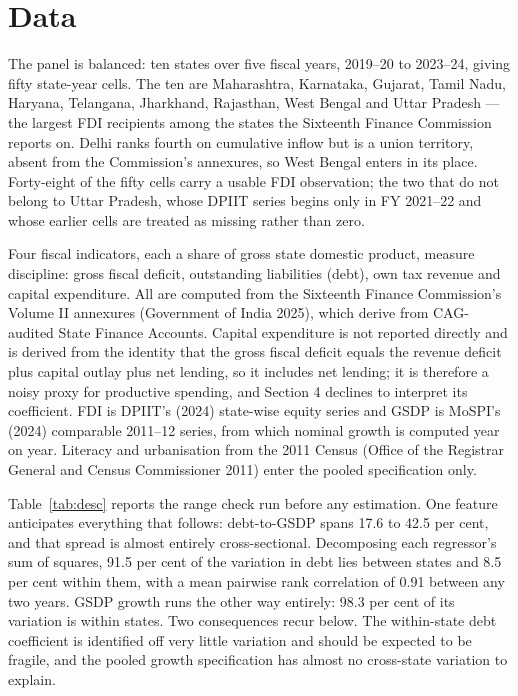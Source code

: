 \documentclass[12pt]{article}
\begin{document}
\section{Data}

The panel is balanced: ten states over five fiscal years, 2019--20 to 2023--24,
giving fifty state-year cells. The ten are Maharashtra, Karnataka, Gujarat, Tamil
Nadu, Haryana, Telangana, Jharkhand, Rajasthan, West Bengal and Uttar Pradesh ---
the largest FDI recipients among the states the Sixteenth Finance Commission
reports on. Delhi ranks fourth on cumulative inflow but is a union territory,
absent from the Commission's annexures, so West Bengal enters in its place.
Forty-eight of the fifty cells carry a usable FDI observation; the two that do
not belong to Uttar Pradesh, whose DPIIT series begins only in FY 2021--22 and
whose earlier cells are treated as missing rather than zero.

Four fiscal indicators, each a share of gross state domestic product, measure
discipline: gross fiscal deficit, outstanding liabilities (debt), own tax revenue
and capital expenditure. All are computed from the Sixteenth Finance Commission's
Volume II annexures (Government of India 2025), which derive from CAG-audited
State Finance Accounts. Capital expenditure is not reported directly and is
derived from the identity that the gross fiscal deficit equals the revenue
deficit plus capital outlay plus net lending, so it includes net lending; it is
therefore a noisy proxy for productive spending, and Section 4 declines to
interpret its coefficient. FDI is DPIIT's (2024) state-wise equity series and
GSDP is MoSPI's (2024) comparable 2011--12 series, from which nominal growth is
computed year on year. Literacy and urbanisation from the 2011 Census (Office of
the Registrar General and Census Commissioner 2011) enter the pooled
specification only.

Table~\ref{tab:desc} reports the range check run before any estimation. One
feature anticipates everything that follows: debt-to-GSDP spans 17.6 to 42.5 per
cent, and that spread is almost entirely cross-sectional. Decomposing each
regressor's sum of squares, 91.5 per cent of the variation in debt lies between
states and 8.5 per cent within them, with a mean pairwise rank correlation of
0.91 between any two years. GSDP growth runs the other way entirely: 98.3 per
cent of its variation is within states. Two consequences recur below. The
within-state debt coefficient is identified off very little variation and should
be expected to be fragile, and the pooled growth specification has almost no
cross-state variation to explain.
\end{document}
